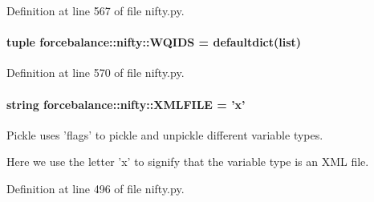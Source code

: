 \-Definition at line 567 of file nifty.\-py.

\hypertarget{namespaceforcebalance_1_1nifty_a1410db09cf3d0507bcf758d46e83c711}{
\paragraph[{\-W\-Q\-I\-D\-S}]{\setlength{\rightskip}{0pt plus 5cm}tuple {\bf forcebalance\-::nifty\-::\-W\-Q\-I\-D\-S} = defaultdict(list)}}\label{namespaceforcebalance_1_1nifty_a1410db09cf3d0507bcf758d46e83c711}


\-Definition at line 570 of file nifty.\-py.

\hypertarget{namespaceforcebalance_1_1nifty_a89b76b7b16a8e2533c6599fa9ff8cff6}{
\paragraph[{\-X\-M\-L\-F\-I\-L\-E}]{\setlength{\rightskip}{0pt plus 5cm}string {\bf forcebalance\-::nifty\-::\-X\-M\-L\-F\-I\-L\-E} = 'x'}}\label{namespaceforcebalance_1_1nifty_a89b76b7b16a8e2533c6599fa9ff8cff6}


\-Pickle uses 'flags' to pickle and unpickle different variable types. 

\-Here we use the letter 'x' to signify that the variable type is an \-X\-M\-L file. 

\-Definition at line 496 of file nifty.\-py.

